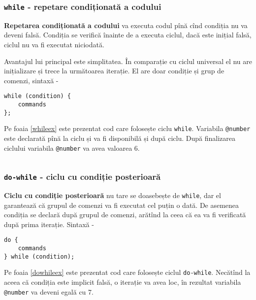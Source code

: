 \begin{sourcecode}
\label{uniloopex}
\inputminted[linenos]{icl}{../sources/uniloopex.icL}
\end{sourcecode}

\subsubsection{\texttt{while} - repetare condiționată a codului}

{\bf Repetarea condiționată a codului} va executa codul pînă cînd condiția nu va deveni falsă. Condiția se verifică înainte de a executa ciclul, dacă este inițial falsă, ciclul nu va fi executat niciodată.

Avantajul lui principal este simplitatea. În comparație cu ciclul universal el nu are inițializare și trece la următoarea iterație. El are doar condiție și grup de comenzi, sintaxă -
\begin{verbatim}
while (condition) {
	commands
};
\end{verbatim}

Pe foaia \ref{whileex} este prezentat cod care folosește ciclu \texttt{while}. Variabila \texttt{@number} este declarată pînă la ciclu și va fi disponibilă și după ciclu. După finalizarea ciclului variabila \texttt{@number} va avea valoarea 6.

\begin{sourcecode}
\label{whileex}
\inputminted[linenos]{icl}{../sources/whileex.icL}
\end{sourcecode}

\subsubsection{\texttt{do-while} - ciclu cu condiție posterioară}

{\bf Ciclu cu condiție posterioară} nu tare se doasebește de \texttt{while}, dar el garantează că grupul de comenzi va fi executat cel puțin o dată. De asemenea condiția se declară după grupul de comenzi, arătînd la ceea că ea va fi verificată după prima iterație. Sintaxă -
\begin{verbatim}
do {
	commands
} while (condition);
\end{verbatim}

Pe foaia \ref{dowhileex} este prezentat cod care folosește ciclul \texttt{do-while}. Necătînd la aceea că condiția este implicit falsă, o iterație va avea loc, în rezultat variabila \texttt{@number} va deveni egală cu 7.

